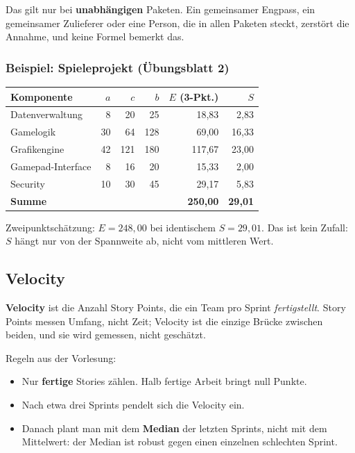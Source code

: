 \documentclass[12pt, a4paper]{article}
\begin{document}
\begin{notebox}
Das gilt nur bei \textbf{unabhängigen} Paketen. Ein gemeinsamer Engpass, ein
gemeinsamer Zulieferer oder eine Person, die in allen Paketen steckt, zerstört die
Annahme, und keine Formel bemerkt das.
\end{notebox}

\subsubsection*{Beispiel: Spieleprojekt (Übungsblatt 2)}

\begin{center}
\begin{tabular}{lrrr|rr}
\hline
\textbf{Komponente} & $a$ & $c$ & $b$ & $E$ (3-Pkt.) & $S$ \\
\hline
Datenverwaltung   &  8 &  20 &  25 &  18{,}83 &  2{,}83 \\
Gamelogik         & 30 &  64 & 128 &  69{,}00 & 16{,}33 \\
Grafikengine      & 42 & 121 & 180 & 117{,}67 & 23{,}00 \\
Gamepad-Interface &  8 &  16 &  20 &  15{,}33 &  2{,}00 \\
Security          & 10 &  30 &  45 &  29{,}17 &  5{,}83 \\
\hline
\textbf{Summe}    &    &     &     & \textbf{250{,}00} & \textbf{29{,}01} \\
\hline
\end{tabular}
\end{center}

Zweipunktschätzung: $E = 248{,}00$ bei identischem $S = 29{,}01$. Das ist kein Zufall:
$S$ hängt nur von der Spannweite ab, nicht vom mittleren Wert.

\subsection{Velocity}

\begin{definitionbox}
\textbf{Velocity} ist die Anzahl Story Points, die ein Team pro Sprint
\emph{fertigstellt}. Story Points messen Umfang, nicht Zeit; Velocity ist die einzige
Brücke zwischen beiden, und sie wird gemessen, nicht geschätzt.
\end{definitionbox}

Regeln aus der Vorlesung:

\begin{itemize}
  \item Nur \textbf{fertige} Stories zählen. Halb fertige Arbeit bringt null Punkte.
  \item Nach etwa drei Sprints pendelt sich die Velocity ein.
  \item Danach plant man mit dem \textbf{Median} der letzten Sprints, nicht mit dem
        Mittelwert: der Median ist robust gegen einen einzelnen schlechten Sprint.
\end{itemize}
\end{document}

